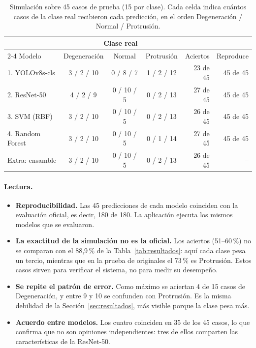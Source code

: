 \begin{table}[htbp]
\centering\small
\caption{Simulación sobre 45 casos de prueba (15 por clase). Cada celda indica cuántos casos de la clase real recibieron cada predicción, en el orden Degeneración / Normal / Protrusión.}
\label{tab:simulacion}
\begin{tabular}{lcccrr}
\toprule
 & \multicolumn{3}{c}{Clase real} & & \\
\cmidrule(lr){2-4}
Modelo & Degeneración & Normal & Protrusión & Aciertos & Reproduce \\
\midrule
1. YOLOv8s-cls   & 3 / 2 / 10 & 0 / 8 / 7  & 1 / 2 / 12 & 23 de 45 & 45 de 45 \\
2. ResNet-50     & 4 / 2 / 9  & 0 / 10 / 5 & 0 / 2 / 13 & 27 de 45 & 45 de 45 \\
3. SVM (RBF)     & 3 / 2 / 10 & 0 / 10 / 5 & 0 / 2 / 13 & 26 de 45 & 45 de 45 \\
4. Random Forest & 3 / 2 / 10 & 0 / 10 / 5 & 0 / 1 / 14 & 27 de 45 & 45 de 45 \\
\midrule
Extra: ensamble  & 3 / 2 / 10 & 0 / 10 / 5 & 0 / 2 / 13 & 26 de 45 & -- \\
\bottomrule
\end{tabular}
\end{table}

\paragraph{Lectura.}
\begin{itemize}
  \item \textbf{Reproducibilidad.} Las 45 predicciones de cada modelo coinciden con la evaluación oficial, es decir, 180 de 180. La aplicación ejecuta los mismos modelos que se evaluaron.
  \item \textbf{La exactitud de la simulación no es la oficial.} Los aciertos (51--60\,\%) no se comparan con el 88,9\,\% de la Tabla~\ref{tab:resultados}: aquí cada clase pesa un tercio, mientras que en la prueba de originales el 73\,\% es Protrusión. Estos casos sirven para verificar el sistema, no para medir su desempeño.
  \item \textbf{Se repite el patrón de error.} Como máximo se aciertan 4 de 15 casos de Degeneración, y entre 9 y 10 se confunden con Protrusión. Es la misma debilidad de la Sección~\ref{sec:resultados}, más visible porque la clase pesa más.
  \item \textbf{Acuerdo entre modelos.} Los cuatro coinciden en 35 de los 45 casos, lo que confirma que no son opiniones independientes: tres de ellos comparten las características de la ResNet-50.
\end{itemize}
